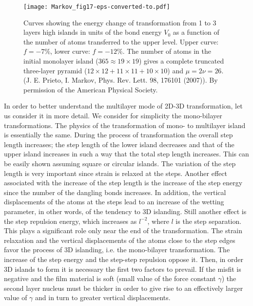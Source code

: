 \documentclass[aps,prl,showpacs,twocolumn,byrevtex,floatfix]{revtex4-1}
\begin{document}
\begin{figure}[htb]
\texttt{[image: Markov\_fig17-eps-converted-to.pdf]}
\caption{\label{multigrowth} Curves showing the energy change of transformation
from 1 to 3 layers high islands in units of the bond energy $V_0$ as a function
of the number of atoms transferred to the upper level. Upper curve: $f = - 7\%$,
lower curve: $f = - 12\%$. The number of atoms in the initial monolayer island
($365 \approx 19 \times 19$) gives a complete truncated three-layer pyramid ($12
\times 12 + 11 \times 11 + 10 \times 10$) and $\mu = 2\nu = 26$. (J. E. Prieto,
I. Markov, Phys. Rev. Lett. 98, 176101 (2007)). By permission of the American
Physical Society.}
\end{figure}



In order to better understand the multilayer mode of 2D-3D transformation, let
us consider it in more detail. We consider for simplicity the mono-bilayer
transformations. The physics of the transformation of mono- to
multilayer island is essentially the same. During the process of transformation
the overall step length increases; the step length of the lower island
decreases and that of the upper island increases in such a way that the total
step length increases. This can be easily shown assuming square or circular
islands. The variation of the step length is very important since strain is
relaxed at the steps. Another effect associated with the increase of the
step length is the increase of the step energy since the number of the dangling
bonds increases. In addition, the vertical displacements of the atoms at the 
steps lead to an increase of the wetting parameter, in other words, of the 
tendency to 3D islanding. Still another effect is the step repulsion energy, 
which increases as $l^{-2}$, where $l$ is the step separation.\cite{Nozieres92}
This plays a significant role only near the end of the transformation. The
strain relaxation and the vertical displacements of the atoms close to the step
edges favor the process of 3D islanding, i.e. the mono-bilayer
transformation.\cite{Prieto05,Muller96} The increase of the step energy and the
step-step repulsion oppose it. Then, in order 3D islands to form it is necessary
the first two factors to prevail. If the misfit is negative and the film
material is soft (small value of the force constant $\gamma$) the second layer
nucleus must be thicker in order to give rise to an effectively larger value of
$\gamma$ and in turn to greater vertical displacements.
\end{document}
